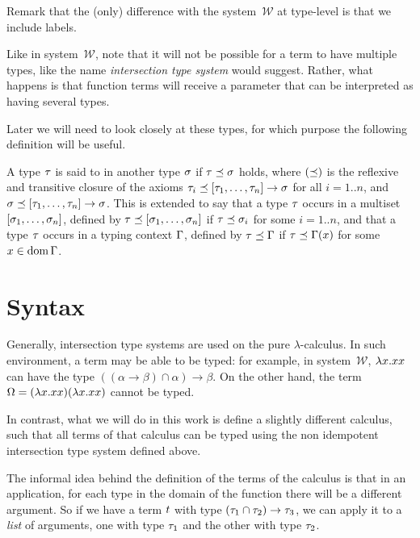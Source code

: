 Remark that the (only) difference with the system~$\mathcal{W}$
at type-level is that we include labels.

Like in system~$\mathcal{W}$, note that it will not be possible for a term to have multiple types,
like the name \textit{intersection type system} would suggest.
Rather, what happens is that function terms will receive a parameter that can be interpreted
as having several types.

Later we will need to look closely at these types,
for which purpose the following definition will be useful.

\begin{definition}
A type $\tau$ is said to  in another type $\sigma$ if
$\tau \preceq \sigma$ holds,
where $(\preceq)$ is the reflexive and transitive closure of
the axioms
$\tau_i \preceq [\tau_1,\hdots,\tau_n] \to \sigma$ for all $i=1..n$,
and $\sigma \preceq [\tau_1,\hdots,\tau_n] \to \sigma$.
This is extended to say that a type $\tau$ occurs in a multiset $[\sigma_1,\hdots,\sigma_n]$,
defined by $\tau \preceq [\sigma_1,\hdots,\sigma_n]$ if $\tau \preceq \sigma_i$ for some $i=1..n$,
and that a type $\tau$ occurs in a typing context $\Gamma$,
defined by $\tau \preceq \Gamma$ if $\tau \preceq \Gamma(x)$ for some $x \in \operatorname{dom}\Gamma$.
\end{definition}


\section{Syntax}

Generally, intersection type systems are used on the pure $\lambda$-calculus.
In such environment, a term may be able to be typed:
for example, in system~$\mathcal{W}$,
$\lambda x. x x$ can have the type $((\alpha \to \beta) \cap \alpha) \to \beta$.
On the other hand, the term $\Omega = (\lambda x. x x) (\lambda x. x x)$ cannot
be typed.

In contrast, what we will do in this work is define a slightly different
calculus, such that all terms of that calculus can be typed using
the non idempotent intersection type system defined above.

The informal idea behind the definition of the terms of the calculus is that
in an application, for each type in the domain of the function there will be
a different argument. So if we have a term $t$ with type
$(\tau_1 \cap \tau_2) \to \tau_3$, we can apply it to a \textit{list}
of arguments, one with type $\tau_1$ and the other with type $\tau_2$.

